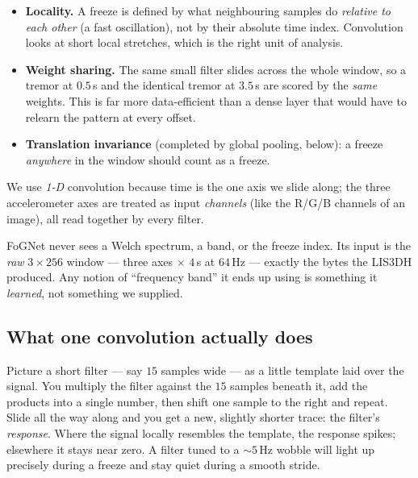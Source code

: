 \begin{itemize}
  \item \textbf{Locality.} A freeze is defined by what neighbouring samples do
  \emph{relative to each other} (a fast oscillation), not by their absolute time
  index. Convolution looks at short local stretches, which is the right unit of
  analysis.
  \item \textbf{Weight sharing.} The same small filter slides across the whole
  window, so a tremor at $0.5$\,\unit{\second} and the identical tremor at
  $3.5$\,\unit{\second} are scored by the \emph{same} weights. This is far more
  data-efficient than a dense layer that would have to relearn the pattern at every
  offset.
  \item \textbf{Translation invariance} (completed by global pooling, below): a
  freeze \emph{anywhere} in the window should count as a freeze.
\end{itemize}

We use \emph{1-D} convolution because time is the one axis we slide along; the three
accelerometer axes are treated as input \emph{channels} (like the R/G/B channels of
an image), all read together by every filter.

\begin{keyidea}
FoGNet never sees a Welch spectrum, a band, or the freeze index. Its input is the
\emph{raw} $3\times256$ window --- three axes $\times$ $4$\,\unit{\second} at
$64$\,\unit{\hertz} --- exactly the bytes the LIS3DH produced. Any notion of
``frequency band'' it ends up using is something it \emph{learned}, not something we
supplied.
\end{keyidea}

\subsection{What one convolution actually does}

Picture a short filter --- say $15$ samples wide --- as a little template laid over
the signal. You multiply the filter against the $15$ samples beneath it, add the
products into a single number, then shift one sample to the right and repeat. Slide
all the way along and you get a new, slightly shorter trace: the filter's
\emph{response}. Where the signal locally resembles the template, the response spikes;
elsewhere it stays near zero. A filter tuned to a $\sim5$\,\unit{\hertz} wobble will
light up precisely during a freeze and stay quiet during a smooth stride.

